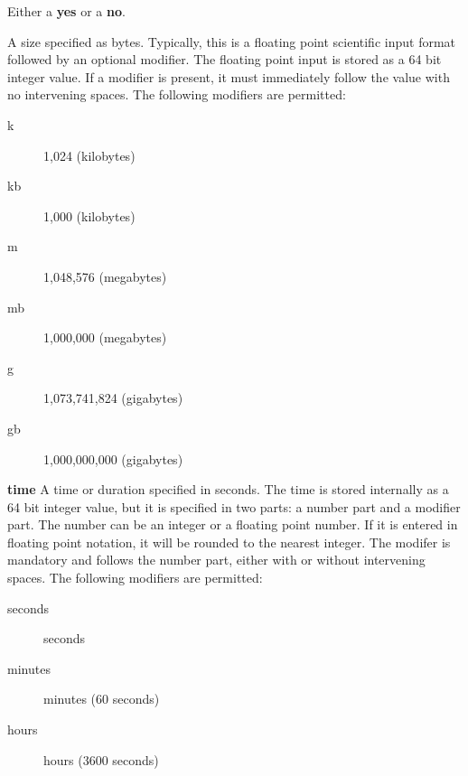 \begin{description}
\item [yes|no]
   Either a {\bf yes} or a {\bf no}. 

\item [
   \label{Size1}
   size]
A size specified as bytes. Typically, this is  a floating point scientific
input format followed by an optional modifier. The  floating point input is
stored as a 64 bit integer value.  If a modifier is present, it must
immediately follow the  value with no intervening spaces. The following
modifiers are permitted:  

\begin{description}

\item [k]
   1,024 (kilobytes)  

\item [kb]
   1,000 (kilobytes)  

\item [m]
   1,048,576 (megabytes)  

\item [mb]
   1,000,000 (megabytes)  

\item [g]
   1,073,741,824 (gigabytes) 

\item [gb]
   1,000,000,000 (gigabytes) 
   \end{description}

\item {\bf 
   \label{Time} 
   time}
A time or duration specified in seconds.  The time is stored internally as a
64 bit integer value, but  it is specified in two parts: a number part and a
modifier part.  The number can be an integer or a floating point number. If it
is entered in floating point notation, it will be rounded to  the nearest
integer.  The modifer is mandatory and follows the number part,  either with
or without intervening spaces.  The following modifiers are permitted:

\begin{description}

\item [seconds]
   seconds  

\item [minutes]
   minutes (60 seconds)  

\item [hours]
   hours (3600 seconds)  


\end{description}
\end{description}
